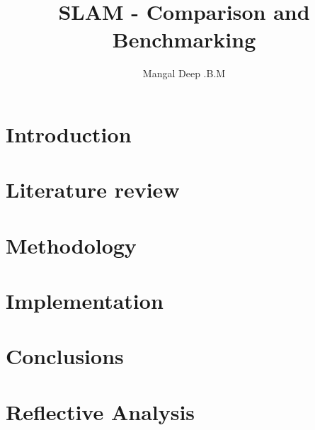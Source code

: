 \documentclass{lincolncsuthesis}
\title{SLAM - Comparison and Benchmarking}
\author{Mangal Deep .B.M}
\begin{document}
\maketitle







\thesisTables
\thesisBodyStart





\chapter{Introduction}


\chapter{Literature review}


\chapter{Methodology}


\chapter{Implementation}


\chapter{Conclusions}


\chapter{Reflective Analysis}

\end{document}
